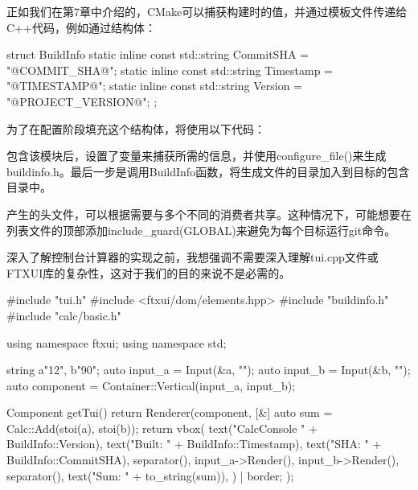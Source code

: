 正如我们在第7章中介绍的，CMake可以捕获构建时的值，并通过模板文件传递给C++代码，例如通过结构体：


\begin{cpp}
struct BuildInfo {
    static inline const std::string CommitSHA = "@COMMIT_SHA@";
    static inline const std::string Timestamp = "@TIMESTAMP@";
    static inline const std::string Version = "@PROJECT_VERSION@";
};
\end{cpp}

为了在配置阶段填充这个结构体，将使用以下代码：



包含该模块后，设置了变量来捕获所需的信息，并使用configure\_file()来生成buildinfo.h。最后一步是调用BuildInfo函数，将生成文件的目录加入到目标的包含目录中。

产生的头文件，可以根据需要与多个不同的消费者共享。这种情况下，可能想要在列表文件的顶部添加include\_guard(GLOBAL)来避免为每个目标运行git命令。

深入了解控制台计算器的实现之前，我想强调不需要深入理解tui.cpp文件或FTXUI库的复杂性，这对于我们的目的来说不是必需的。


\begin{cpp}
#include "tui.h"
#include <ftxui/dom/elements.hpp>
#include "buildinfo.h"
#include "calc/basic.h"

using namespace ftxui;
using namespace std;

string a{"12"}, b{"90"};
auto input_a = Input(&a, "");
auto input_b = Input(&b, "");
auto component = Container::Vertical({input_a, input_b});

Component getTui() {
    return Renderer(component, [&] {
        auto sum = Calc::Add(stoi(a), stoi(b));
        return vbox({
            text("CalcConsole " + BuildInfo::Version),
            text("Built: " + BuildInfo::Timestamp),
            text("SHA: " + BuildInfo::CommitSHA),
            separator(),
            input_a->Render(),
            input_b->Render(),
            separator(),
            text("Sum: " + to_string(sum)),
        }) |
        border;
    });
}
\end{cpp}

